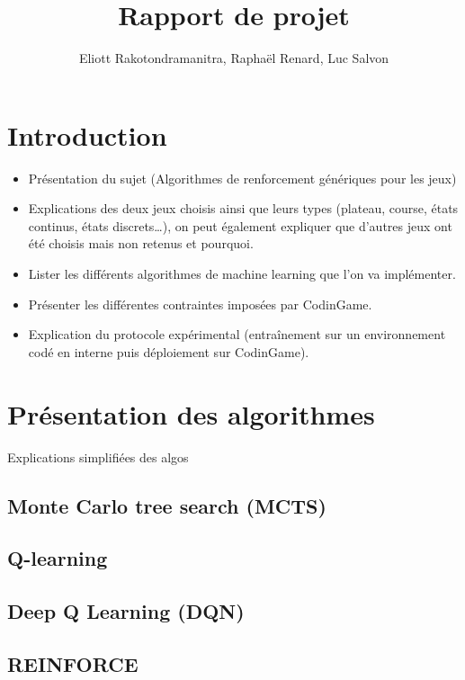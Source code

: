 \documentclass{article}
\title{Rapport de projet}
\author{Eliott Rakotondramanitra, Raphaël Renard, Luc Salvon}
\begin{document}
\maketitle



\section{Introduction}
\begin{itemize}
\item Présentation du sujet (Algorithmes de renforcement génériques pour les jeux)

\item Explications des deux jeux choisis ainsi que leurs types (plateau, course, états continus, états discrets…), on peut également expliquer que d’autres jeux ont été choisis mais non retenus et pourquoi.

\item Lister les différents algorithmes de machine learning que l’on va implémenter.

\item Présenter les différentes contraintes imposées par CodinGame.

\item Explication du protocole expérimental (entraînement sur un environnement codé en interne puis déploiement sur CodinGame).
\end{itemize}

\section{Présentation des algorithmes}
Explications simplifiées des algos

\subsection{Monte Carlo tree search (MCTS)}

\subsection{Q-learning}

\subsection{Deep Q Learning (DQN)}

\subsection{REINFORCE}
\end{document}
